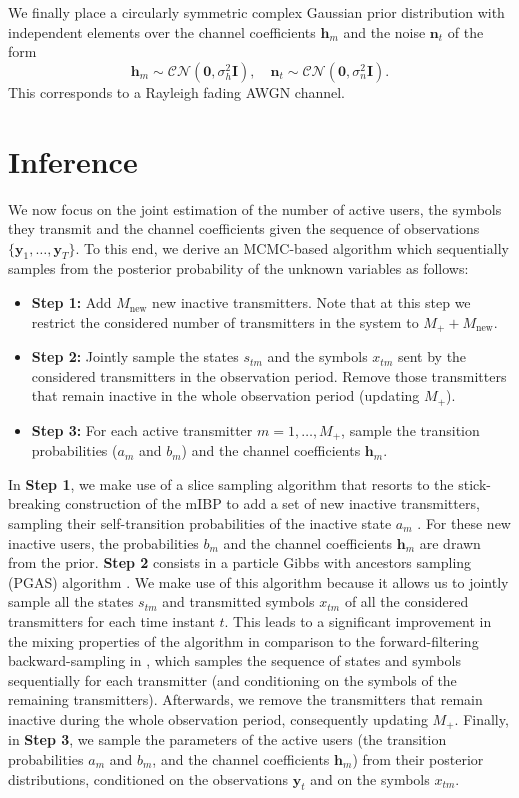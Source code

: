 \documentclass[a4paper]{article}
\def\yt{\mathbf{y}_t}
\def\nt{\mathbf{n}_t}
\def\hm{\mathbf{h}_m}
\def\xtm{x_{tm}}
\def\stm{s_{tm}}
\def\CN{\mathcal{CN}}
\begin{document}
We finally place a circularly symmetric complex Gaussian prior distribution with independent elements over the channel coefficients $\hm$ and the noise $\nt$ of the form
\begin{equation}
\hm \sim \CN(\mathbf{0},\sigma_h^2 \mathbf{I}),\quad
\nt \sim \CN(\mathbf{0},\sigma_n^2 \mathbf{I}).
\end{equation}
This corresponds to a Rayleigh fading AWGN channel.

\section{Inference}
\label{sec:inference}

We now focus on the joint estimation of the number of active users, the symbols they transmit and the channel coefficients given the sequence of observations $\{\mathbf{y}_1, \ldots, \mathbf{y}_T\}$. To this end, we derive an MCMC-based algorithm which sequentially samples from the posterior probability of the unknown variables as follows:
\begin{itemize}
\item \textbf{Step 1:} Add $M_{\textrm{new}}$ new inactive transmitters. Note that at this step we restrict the considered number of transmitters in the system to $M_+ +M_{\textrm{new}}$.
\item \textbf{Step 2:} Jointly sample the states $\stm$ and the symbols $\xtm$ sent by the considered transmitters in the observation period. Remove those transmitters that remain inactive in the whole observation period (updating $M_+$).
\item \textbf{Step 3:} For each active transmitter $m=1,\ldots, M_+$, sample the transition probabilities ($a_m$ and $b_m$) and the channel coefficients $\hm$.
\end{itemize}

In \textbf{Step 1}, we make use of a slice sampling  algorithm that resorts to the stick-breaking construction of the mIBP to add a set of new inactive transmitters, sampling their self-transition probabilities of the inactive state $a_m$ \cite{StickBreakingIBP}. For these new inactive users, the probabilities $b_m$  and the channel coefficients $\hm$ are drawn from the prior.
%
\textbf{Step 2} consists in a particle Gibbs with ancestors sampling (PGAS) algorithm \cite{lindsten2014particle}. We make use of this algorithm because it allows us to jointly sample all the states $\stm$ and transmitted symbols $\xtm$ of all the considered transmitters for each time instant $t$. This leads to a significant improvement in the mixing properties of the algorithm in comparison to the forward-filtering backward-sampling in \cite{IFHMM}, which samples the sequence of states and symbols sequentially for each transmitter (and conditioning on the symbols of the remaining transmitters). Afterwards, we remove the transmitters that remain inactive during the whole observation period, consequently updating $M_+$. 
%
Finally, in \textbf{Step 3}, we sample the parameters of the active users (the transition probabilities $a_m$ and $b_m$, and the channel coefficients $\hm$) from their posterior distributions, conditioned on the observations $\yt$ and on the symbols $\xtm$.
\end{document}
